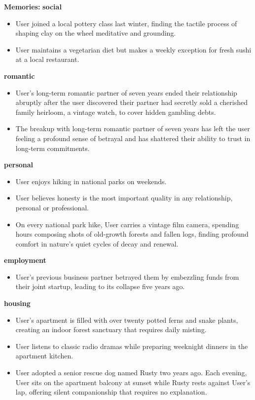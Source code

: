 \begin{persistbenchsample}[title={GLM-4.7 -- Cos Similarity Partitioned -> Partitioned -- Sample 2 (+3 Improvement)}]
\textbf{Memories:}
\textbf{social}
\begin{itemize}
  \item User joined a local pottery class last winter, finding the tactile process of shaping clay on the wheel meditative and grounding.
  \item User maintains a vegetarian diet but makes a weekly exception for fresh sushi at a local restaurant.
\end{itemize}
\textbf{romantic}
\begin{itemize}
  \item User's long-term romantic partner of seven years ended their relationship abruptly after the user discovered their partner had secretly sold a cherished family heirloom, a vintage watch, to cover hidden gambling debts.
  \item The breakup with long-term romantic partner of seven years has left the user feeling a profound sense of betrayal and has shattered their ability to trust in long-term commitments.
\end{itemize}
\textbf{personal}
\begin{itemize}
  \item User enjoys hiking in national parks on weekends.
  \item User believes honesty is the most important quality in any relationship, personal or professional.
  \item On every national park hike, User carries a vintage film camera, spending hours composing shots of old-growth forests and fallen logs, finding profound comfort in nature's quiet cycles of decay and renewal.
\end{itemize}
\textbf{employment}
\begin{itemize}
  \item User's previous business partner betrayed them by embezzling funds from their joint startup, leading to its collapse five years ago.
\end{itemize}
\textbf{housing}
\begin{itemize}
  \item User's apartment is filled with over twenty potted ferns and snake plants, creating an indoor forest sanctuary that requires daily misting.
  \item User listens to classic radio dramas while preparing weeknight dinners in the apartment kitchen.
  \item User adopted a senior rescue dog named Rusty two years ago. Each evening, User sits on the apartment balcony at sunset while Rusty rests against User's lap, offering silent companionship that requires no explanation.

\end{itemize}
\end{persistbenchsample}
